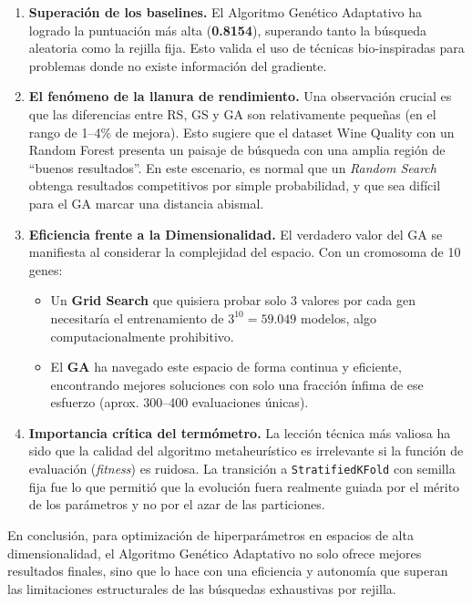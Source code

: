 \documentclass[12pt, a4paper]{article}
\begin{document}
\begin{enumerate}[itemsep=0.3em]
  \item \textbf{Superación de los baselines.} El Algoritmo Genético Adaptativo ha logrado
        la puntuación más alta (\textbf{0.8154}), superando tanto la búsqueda aleatoria
        como la rejilla fija. Esto valida el uso de técnicas bio-inspiradas para problemas
        donde no existe información del gradiente.

  \item \textbf{El fenómeno de la llanura de rendimiento.} Una observación crucial es que las
        diferencias entre RS, GS y GA son relativamente pequeñas (en el rango de 1--4\%
        de mejora). Esto sugiere que el dataset Wine Quality con un Random Forest presenta un
        paisaje de búsqueda con una amplia región de ``buenos resultados''. En este
        escenario, es normal que un \textit{Random Search} obtenga resultados competitivos
        por simple probabilidad, y que sea difícil para el GA marcar una distancia abismal.

  \item \textbf{Eficiencia frente a la Dimensionalidad.} El verdadero valor del GA se
        manifiesta al considerar la complejidad del espacio. Con un cromosoma de 10 genes:
        \begin{itemize}
          \item Un \textbf{Grid Search} que quisiera probar solo 3 valores por cada gen
                necesitaría el entrenamiento de $3^{10} = 59.049$ modelos, algo
                computacionalmente prohibitivo.
          \item El \textbf{GA} ha navegado este espacio de forma continua y eficiente,
                encontrando mejores soluciones con solo una fracción ínfima de ese esfuerzo (aprox. 300--400 evaluaciones únicas).
        \end{itemize}

  \item \textbf{Importancia crítica del termómetro.} La lección técnica más valiosa ha sido
        que la calidad del algoritmo metaheurístico es irrelevante si la función de
        evaluación (\textit{fitness}) es ruidosa. La transición a \texttt{StratifiedKFold}
        con semilla fija fue lo que permitió que la evolución fuera realmente guiada por el
        mérito de los parámetros y no por el azar de las particiones.
\end{enumerate}

En conclusión, para optimización de hiperparámetros en espacios de alta dimensionalidad, el
Algoritmo Genético Adaptativo no solo ofrece mejores resultados finales, sino que lo hace
con una eficiencia y autonomía que superan las limitaciones estructurales de las búsquedas
exhaustivas por rejilla.
\end{document}
